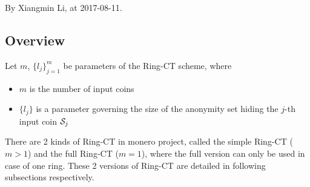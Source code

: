 By Xiangmin Li, at 2017-08-11.
\subsection{Overview}
Let \(m\), \(\{l_j\}_{j=1}^m\) be parameters of the Ring-CT scheme, where
	\begin{itemize}
		\item \(m\) is the number of input coins 
		\item \(\{l_j\}\) is a parameter governing the size of the anonymity set hiding the \(j\)-th input coin \(\mathcal{S}_j\)
	\end{itemize}
There are 2 kinds of Ring-CT in monero project, called the simple Ring-CT (\(m>1\)) and the full Ring-CT (\(m=1\)), where the full version can only be used in case of one ring. These 2 versions of Ring-CT are detailed in following subsections respectively. \par
